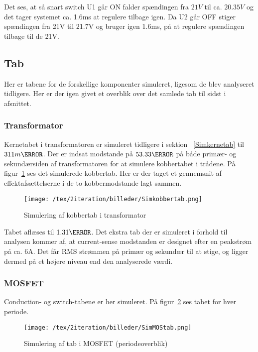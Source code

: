 Det ses, at så snart switch U1 går ON falder spændingen fra $21V$ til ca. $20.35V$ og det tager systemet ca. 1.6ms at regulere tilbage igen. Da U2 går OFF stiger spændingen fra 21V til 21.7V og bruger igen 1.6ms, på at regulere spændingen tilbage til de 21V. 



\subsection{Tab}
Her er tabene for de forskellige komponenter simuleret, ligesom de blev analyseret tidligere. Her er der igen givet et overblik over det samlede tab til sidst i afsnittet.

\subsubsection{Transformator}
Kernetabet i transformatoren er simuleret tidligere i sektion ~\ref{Simkernetab} til $311m\watt$. Der er indsat modstande på $53.33\ohm$ på både primær- og sekundærsiden af transformatoren for at simulere kobbertabet i trådene. På figur~\ref{fig: Simkobbertab} ses det simulerede kobbertab. Her er der taget et gennemsnit af effektafsættelserne i de to kobbermodstande lagt sammen. 
\begin{figure}[H]
	\center
	\texttt{[image: /tex/2iteration/billeder/Simkobbertab.png]}
	\caption{Simulering af kobbertab i transformator}
	\label{fig: Simkobbertab}
\end{figure}

Tabet aflæses til $1.31\watt$. Det ekstra tab der er simuleret i forhold til analysen kommer af, at current-sense modstanden er designet efter en peakstrøm på ca. 6A. Det får RMS strømmen på primær og sekundær til at stige, og ligger dermed på et højere niveau end den analyserede værdi.

\subsubsection{MOSFET} \label{MOSFETsimtab}
\noindent Conduction- og switch-tabene er her simuleret. På figur~\ref{fig: SimMOStab} ses tabet for hver periode.

\begin{figure}[H]
	\center
	\texttt{[image: /tex/2iteration/billeder/SimMOStab.png]}
	\caption{Simulering af tab i MOSFET (periodeoverblik)}
	\label{fig: SimMOStab}
\end{figure} 

